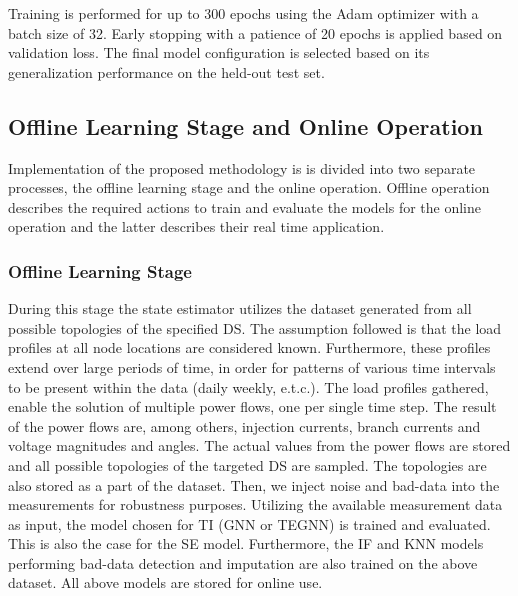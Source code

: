 \documentclass[journal]{IEEEtran}  %
\begin{document}
Training is performed for up to 300 epochs using the Adam optimizer with a batch size of 32. Early stopping with a patience of 20 epochs is applied based on validation loss. The final model configuration is selected based on its generalization performance on the held-out test set.



\subsection{Offline Learning Stage and Online Operation}
Implementation of the proposed methodology is is divided into two separate processes, the offline learning stage and the online operation. Offline operation describes the required actions to train and evaluate the models for the online operation and the latter describes their real time application.

\subsubsection*{Offline Learning Stage}
During this stage the state estimator utilizes the dataset generated from all possible topologies of the specified DS. The assumption followed is that the load profiles at all node locations are considered known. Furthermore, these profiles extend over large periods of time, in order for patterns of various time intervals to be present within the data (daily weekly, e.t.c.). The load profiles gathered, enable the solution of multiple power flows, one per single time step. The result of the power flows are, among others, injection currents, branch currents and voltage magnitudes and angles. The actual values from the power flows are stored and all possible topologies of the targeted DS are sampled. The topologies are also stored as a part of the dataset. Then, we inject noise and bad-data into the measurements for robustness purposes. Utilizing the available measurement data as input, the model chosen for TI (GNN or TEGNN) is trained and evaluated. This is also the case for the SE model. Furthermore, the IF and KNN models performing bad-data detection and imputation are also trained on the above dataset. All above models are stored for online use.
\end{document}
